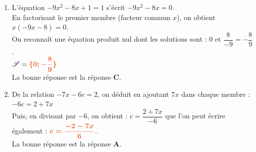 \documentclass[a4paper,11pt]{article}
\begin{document}
{\begin{seanceD}{}
\begin{enumerate}
\item L'équation $-9x^2-8x+1=1$ s'écrit $-9x^2-8x=0$.\\
          En factorisant le premier membre (facteur commun $x$), on obtient $x(-9x-8)=0$.\\
          On reconnaît une équation produit nul dont les solutions sont : $0$ et $\dfrac{8}{-9}=-\dfrac{8}{9}$.\\
          $\mathscr{S}={\color[HTML]{F15929}\boldsymbol{\{0;-\dfrac{8}{9}\}}}$\\La bonne réponse est la réponse {\bfseries \color[HTML]{F15929}C}.

\item De la relation $-7x-6c=2$, on déduit en ajoutant $7x$ dans chaque membre :
          $-6c=2+7x$\\ Puis, en divisant par $-6$, on obtient : $c=\dfrac{2+7x}{-6}$ que l'on peut écrire également : ${\color[HTML]{F15929}\boldsymbol{ c=\dfrac{-2-7x}{6}}}$.\\La bonne réponse est la réponse {\bfseries \color[HTML]{F15929}A}.

\end{enumerate}

\end{seanceD}
}{}
\end{document}
